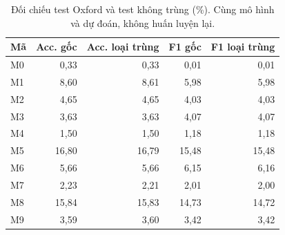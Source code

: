 \begin{table}[H]\centering\small
\caption{Đối chiếu test Oxford và test không trùng (\%). Cùng mô hình và dự đoán, không huấn luyện lại.}
\begin{tabular}{lrrrr}\toprule
Mã & Acc. gốc & Acc. loại trùng & F1 gốc & F1 loại trùng\\\midrule
M0 & 0,33 & 0,33 & 0,01 & 0,01\\
M1 & 8,60 & 8,61 & 5,98 & 5,98\\
M2 & 4,65 & 4,65 & 4,03 & 4,03\\
M3 & 3,63 & 3,63 & 4,07 & 4,07\\
M4 & 1,50 & 1,50 & 1,18 & 1,18\\
M5 & 16,80 & 16,79 & 15,48 & 15,48\\
M6 & 5,66 & 5,66 & 6,15 & 6,16\\
M7 & 2,23 & 2,21 & 2,01 & 2,00\\
M8 & 15,84 & 15,83 & 14,73 & 14,72\\
M9 & 3,59 & 3,60 & 3,42 & 3,42\\
\bottomrule\end{tabular}
\end{table}

